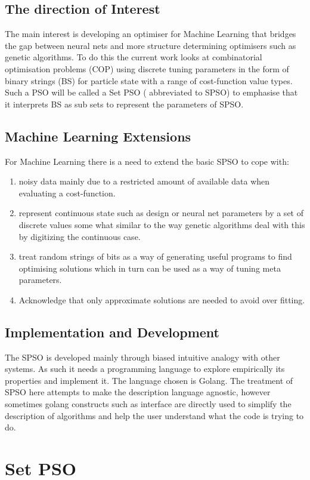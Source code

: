 \documentclass[a4paper,oneside,english]{article}
\numberwithin{equation}{section}
\numberwithin{figure}{section}
\begin{document}
\subsection{The direction of Interest}
The main interest is developing an optimiser for Machine Learning that bridges the gap between neural nets and more structure determining optimisers such as genetic algorithms. To do this the current work looks at combinatorial optimisation problems (COP) using discrete tuning parameters in the form of binary strings (BS) for particle state with a range of cost-function value types. Such  a PSO will be called a Set PSO ( abbreviated to SPSO) to emphasise that it interprets BS as  sub sets to represent the parameters of SPSO. 

\subsection{Machine Learning Extensions }
For  Machine Learning there is a need to extend the basic SPSO to cope with:
\begin{enumerate}
	\item noisy data mainly due to a restricted amount of available data when evaluating a cost-function. 
	\item represent continuous state such as design or neural net parameters by a set of discrete values some what similar to the way genetic algorithms deal with this by digitizing the continuous case.
	\item treat random strings of bits as a way of generating useful programs  to find optimising solutions which in turn can be used as a way of tuning meta parameters.
	\item Acknowledge that only approximate solutions are  needed to avoid over fitting. 
\end{enumerate}  
\subsection{Implementation and Development}
The SPSO is developed mainly through biased intuitive analogy with  other systems. As such it needs a programming language to explore empirically its properties and implement it. The language chosen is Golang. The treatment of SPSO here attempts to make the description language agnostic, however sometimes golang constructs such as interface are directly used to simplify the description of algorithms and help the user understand what the code is trying to do.     

\section{Set PSO}
\end{document}
